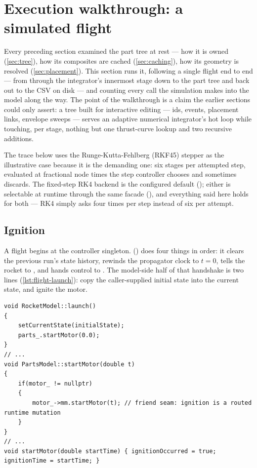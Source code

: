 \section{Execution walkthrough: a simulated flight}\label{sec:flight}

Every preceding section examined the part tree at rest --- how it is owned (\cref{sec:tree}), how
its composites are cached (\cref{sec:caching}), how its geometry is resolved
(\cref{sec:placement}). This section runs it, following a single flight end to end --- from
 through the integrator's innermost stage down to the part tree and
back out to the CSV on disk --- and counting every call the simulation makes into the model along
the way. The point of the walkthrough is a claim the earlier sections could only assert: a tree built
for interactive editing --- ids, events, placement links, envelope sweeps --- serves an adaptive
numerical integrator's hot loop while touching, per stage, nothing but one thrust-curve lookup and
two recursive additions.

The trace below uses the Runge-Kutta-Fehlberg (RKF45) stepper as the illustrative case because it
is the demanding one: six stages per attempted step, evaluated at fractional node times the step
controller chooses and sometimes discards. The fixed-step RK4 backend is the configured default
(); either is selectable at runtime through the same
 facade (), and everything said here holds for both
--- RK4 simply asks four times per step instead of six per attempt.

\subsection{Ignition}\label{sec:flight-ignition}

A flight begins at the controller singleton. 
() does four things in order: it clears the previous run's state
history, rewinds the propagator clock to $t = 0$, tells the rocket to , and hands
control to . The model-side half of that handshake is two
lines (\cref{lst:flight-launch}): copy the caller-supplied initial state into the current state,
and ignite the motor.

\begin{listing}[htbp]
\begin{verbatim}
void RocketModel::launch()
{
    setCurrentState(initialState);
    parts_.startMotor(0.0);
}
// ...
void PartsModel::startMotor(double t)
{
    if(motor_ != nullptr)
    {
        motor_->mm.startMotor(t); // friend seam: ignition is a routed runtime mutation
    }
}
// ...
void startMotor(double startTime) { ignitionOccurred = true; ignitionTime = startTime; }
\end{verbatim}
\caption{The ignition chain:  $\to$
 $\to$ . The
simulation never holds a motor pointer; it asks the tree.}\label{lst:flight-launch}
\end{listing}

